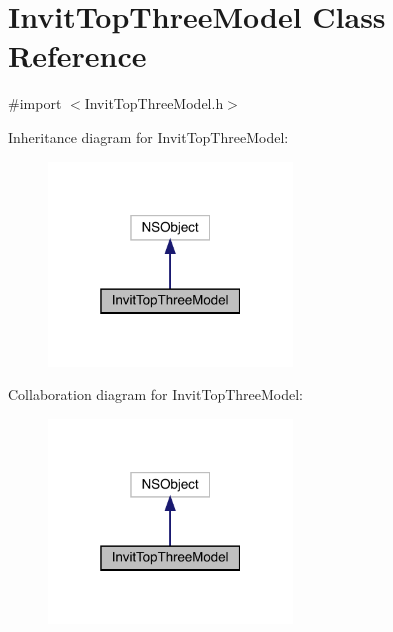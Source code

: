 \hypertarget{interface_invit_top_three_model}{}\section{Invit\+Top\+Three\+Model Class Reference}
\label{interface_invit_top_three_model}


{\ttfamily \#import $<$Invit\+Top\+Three\+Model.\+h$>$}



Inheritance diagram for Invit\+Top\+Three\+Model\+:\nopagebreak
\begin{figure}[H]
\begin{center}
\leavevmode
\includegraphics[width=184pt]{interface_invit_top_three_model__inherit__graph}
\end{center}
\end{figure}


Collaboration diagram for Invit\+Top\+Three\+Model\+:\nopagebreak
\begin{figure}[H]
\begin{center}
\leavevmode
\includegraphics[width=184pt]{interface_invit_top_three_model__coll__graph}
\end{center}
\end{figure}
